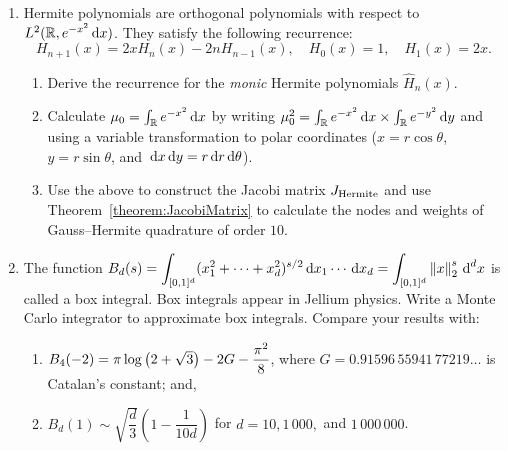 \begin{enumerate}

\item Hermite polynomials are orthogonal polynomials with respect to $L^2(\mathbb{R},e^{-x^2}{\rm\,d} x)$. They satisfy the following recurrence:
\[
H_{n+1}(x) = 2x H_n(x) - 2nH_{n-1}(x), \quad H_0(x) = 1,\quad H_1(x) = 2x.
\]
\begin{enumerate}
\item Derive the recurrence for the {\em monic} Hermite polynomials $\hat{H}_n(x)$.
\item Calculate $\mu_0 = \int_{\mathbb{R}} e^{-x^2}{\rm\,d} x$ by writing $\mu_0^2 = \int_{\mathbb{R}} e^{-x^2}{\rm\,d} x\times \int_{\mathbb{R}} e^{-y^2}{\rm\,d} y$ and using a variable transformation to polar coordinates ($x=r\cos\theta$, $y=r\sin\theta$, and ${\rm\,d} x{\rm\,d} y = r{\rm\,d} r{\rm\,d}\theta$).
\item Use the above to construct the Jacobi matrix $J_{\rm Hermite}$ and use Theorem~\ref{theorem:JacobiMatrix} to calculate the nodes and weights of Gauss--Hermite quadrature of order $10$.
\end{enumerate}


\item The function $\displaystyle B_d(s) = \int_{[0,1]^d} (x_1^2+\cdots+x_d^2)^{s/2}{\rm\,d} x_1\cdots{\rm\,d} x_d = \int_{[0,1]^d} \left\|{x}\right\|_2^s{\rm\,d}^dx$ is called a box integral. Box integrals appear in Jellium physics. Write a Monte Carlo integrator to approximate box integrals. Compare your results with:
\begin{enumerate}
\item $B_4(-2) = \pi\log\pr(2+\sqrt{3}) -2G -\dfrac{\pi^2}{8}$, where $G = 0.91596\,55941\,77219\ldots$ is Catalan's constant; and,
\item $B_d(1) \sim \sqrt{\dfrac{d}{3}}\left(1-\dfrac{1}{10d}\right)$ for $d=10,1\,000,$ and $1\,000\,000$.
\end{enumerate}

\end{enumerate}
